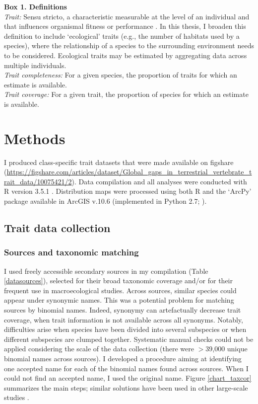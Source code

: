 \clearpage

\begin{mdframed}
\label{Trait_definition_box}
\textbf{Box 1. Definitions}\\
\textit{Trait:} Sensu stricto, a characteristic measurable at the level of an individual and that influences organismal fitness or performance \citep{Violle2007}. In this thesis, I broaden this definition to include `ecological' traits (e.g., the number of habitats used by a species), where the relationship of a species to the surrounding environment needs to be considered. Ecological traits may be estimated by aggregating data across multiple individuals.\\
\textit{Trait completeness:} For a given species, the proportion of traits for which an estimate is available.\\
\textit{Trait coverage:} For a given trait, the proportion of species for which an estimate is available.
\end{mdframed}


\section{Methods}

I produced class-specific trait datasets that were made available on figshare (\url{https://figshare.com/articles/dataset/Global_gaps_in_terrestrial_vertebrate_trait_data/10075421/2}).
Data compilation and all analyses were conducted with R version 3.5.1 \citep{R_citation}.
Distribution maps were processed using both R and the `ArcPy' package available in ArcGIS v.10.6 \citep{ESRI} (implemented in Python 2.7; \citet{Python_citation}).

\subsection{Trait data collection}

\subsubsection{Sources and taxonomic matching}

I used freely accessible secondary sources in my compilation (Table \ref{datasources}), selected for their broad taxonomic coverage and/or for their frequent use in macroecological studies. Across sources, similar species could appear under synonymic names. This was a potential problem for matching sources by binomial names. Indeed, synonymy can artefactually decrease trait coverage, when trait information is not available across all synonyms. Notably, difficulties arise when species have been divided into several subspecies or when different subspecies are clumped together. Systematic manual checks could not be applied considering the scale of the data collection (there were $>$39,000 unique binomial names across sources). I developed a procedure aiming at identifying one accepted name for each of the binomial names found across sources. When I could not find an accepted name, I used the original name. Figure \ref{chart_taxcor} summarizes the main steps; similar solutions have been used in other large-scale studies \citep{Cooke2019b}.

